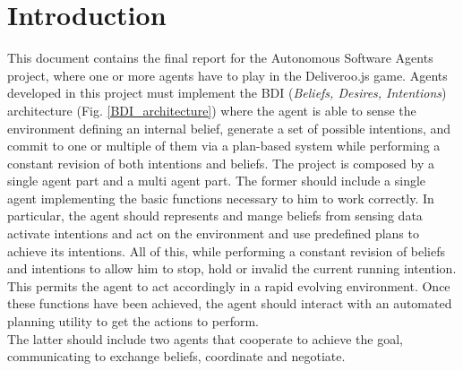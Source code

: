 \section{Introduction}
    This document contains the final report for the Autonomous Software Agents project, where one or more agents have to play in the Deliveroo.js game. Agents developed in this project must implement the BDI (\textit{Beliefs, Desires, Intentions}) architecture (Fig. \ref{BDI_architecture}) where the agent is able to sense the environment defining an internal belief, generate a set of possible intentions, and commit to one or multiple of them via a plan-based system while performing a constant revision of both intentions and beliefs.
    The project is composed by a single agent part and a multi agent part. The former should include a single agent implementing the basic functions necessary to him to work correctly. In particular, the agent should represents and mange beliefs from sensing data activate intentions and act on the environment and use predefined plans to achieve its intentions. All of this, while performing a constant revision of beliefs and intentions to allow him to stop, hold or invalid the current running intention. This permits the agent to act accordingly in a rapid evolving environment. Once these functions have been achieved, the agent should interact with an automated planning utility to get the actions to perform.
    \medskip\\
    The latter should include two agents that cooperate to achieve the goal, communicating to exchange beliefs, coordinate and negotiate.